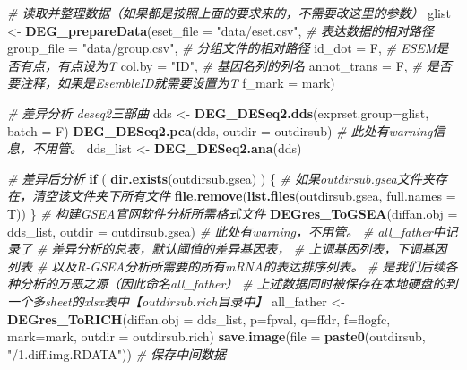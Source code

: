 \documentclass[
]{book}
\newenvironment{Shaded}{\begin{snugshade}}{\end{snugshade}}
\newcommand{\AttributeTok}[1]{\textcolor[rgb]{0.13,0.29,0.53}{#1}}
\newcommand{\CommentTok}[1]{\textcolor[rgb]{0.56,0.35,0.01}{\textit{#1}}}
\newcommand{\ControlFlowTok}[1]{\textcolor[rgb]{0.13,0.29,0.53}{\textbf{#1}}}
\newcommand{\FunctionTok}[1]{\textcolor[rgb]{0.13,0.29,0.53}{\textbf{#1}}}
\newcommand{\NormalTok}[1]{#1}
\newcommand{\OtherTok}[1]{\textcolor[rgb]{0.56,0.35,0.01}{#1}}
\newcommand{\StringTok}[1]{\textcolor[rgb]{0.31,0.60,0.02}{#1}}
\begin{document}
\begin{Shaded}
\begin{Highlighting}[]
\CommentTok{\# 读取并整理数据（如果都是按照上面的要求来的，不需要改这里的参数）}
\NormalTok{glist }\OtherTok{\textless{}{-}} \FunctionTok{DEG\_prepareData}\NormalTok{(}\AttributeTok{eset\_file =} \StringTok{"data/eset.csv"}\NormalTok{, }\CommentTok{\# 表达数据的相对路径}
                         \AttributeTok{group\_file =} \StringTok{"data/group.csv"}\NormalTok{, }\CommentTok{\# 分组文件的相对路径}
                         \AttributeTok{id\_dot =}\NormalTok{ F,  }\CommentTok{\# ESEM是否有点，有点设为T}
                         \AttributeTok{col.by =} \StringTok{"ID"}\NormalTok{,  }\CommentTok{\# 基因名列的列名}
                         \AttributeTok{annot\_trans =}\NormalTok{ F, }\CommentTok{\# 是否要注释，如果是EsembleID就需要设置为T}
                         \AttributeTok{f\_mark =}\NormalTok{ mark)}

\CommentTok{\# 差异分析 deseq2三部曲}
\NormalTok{dds }\OtherTok{\textless{}{-}} \FunctionTok{DEG\_DESeq2.dds}\NormalTok{(}\AttributeTok{exprset.group=}\NormalTok{glist, }\AttributeTok{batch =}\NormalTok{ F)}
\FunctionTok{DEG\_DESeq2.pca}\NormalTok{(dds, }\AttributeTok{outdir =}\NormalTok{ outdirsub) }\CommentTok{\# 此处有warning信息，不用管。}
\NormalTok{dds\_list }\OtherTok{\textless{}{-}} \FunctionTok{DEG\_DESeq2.ana}\NormalTok{(dds)}

\CommentTok{\# 差异后分析}
\ControlFlowTok{if}\NormalTok{ ( }\FunctionTok{dir.exists}\NormalTok{(outdirsub.gsea) ) \{}
  \CommentTok{\# 如果outdirsub.gsea文件夹存在，清空该文件夹下所有文件}
  \FunctionTok{file.remove}\NormalTok{(}\FunctionTok{list.files}\NormalTok{(outdirsub.gsea, }\AttributeTok{full.names =}\NormalTok{ T))}
\NormalTok{\}}
\CommentTok{\# 构建GSEA官网软件分析所需格式文件}
\FunctionTok{DEGres\_ToGSEA}\NormalTok{(}\AttributeTok{diffan.obj =}\NormalTok{ dds\_list, }\AttributeTok{outdir =}\NormalTok{ outdirsub.gsea) }\CommentTok{\# 此处有warning，不用管。}
\CommentTok{\# all\_father中记录了}
\CommentTok{\#             差异分析的总表，默认阈值的差异基因表，}
\CommentTok{\#             上调基因列表，下调基因列表}
\CommentTok{\#             以及R{-}GSEA分析所需要的所有mRNA的表达排序列表。}
\CommentTok{\#   是我们后续各种分析的万恶之源（因此命名all\_father）}
\CommentTok{\#   上述数据同时被保存在本地硬盘的到一个多sheet的xlsx表中【outdirsub.rich目录中】}
\NormalTok{all\_father }\OtherTok{\textless{}{-}} \FunctionTok{DEGres\_ToRICH}\NormalTok{(}\AttributeTok{diffan.obj =}\NormalTok{ dds\_list, }\AttributeTok{p=}\NormalTok{fpval, }\AttributeTok{q=}\NormalTok{ffdr, }\AttributeTok{f=}\NormalTok{flogfc,}
                            \AttributeTok{mark=}\NormalTok{mark, }\AttributeTok{outdir =}\NormalTok{ outdirsub.rich)}
\FunctionTok{save.image}\NormalTok{(}\AttributeTok{file =} \FunctionTok{paste0}\NormalTok{(outdirsub, }\StringTok{"/1.diff.img.RDATA"}\NormalTok{)) }\CommentTok{\# 保存中间数据}
\end{Highlighting}
\end{Shaded}
\end{document}
